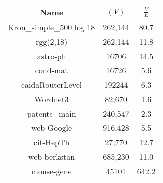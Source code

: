 
\centering
\begin{tabular}{c|c|c}
\hline
Name                               & $\left(V\right)$             & $\frac{V}{E}$              \\ 
\hline
Kron\_simple\_500 log 18           & 262,144                      & 80.7                       \\ 
rgg(2,18)                          & 262,144                      & 11.8                       \\ 
astro-ph                           & 16706                        & 14.5                       \\ 
cond-mat                           & 16726                        & 5.6                        \\ 
caidaRouterLevel                   & 192244                       & 6.3                        \\ 
Wordnet3                           & 82,670                       & 1.6                        \\ 
patents\_main                      & 240,547                      & 2.3                        \\ 
web-Google                         & 916,428                      & 5.5                        \\ 
cit-HepTh                          & 27,770                       & 12.7                       \\ 
web-berkstan 					   & 685,230 					  & 11.0  					   \\ 
mouse-gene   					   & 45101   					  & 642.2 					   \\ 
\hline
\end{tabular}
